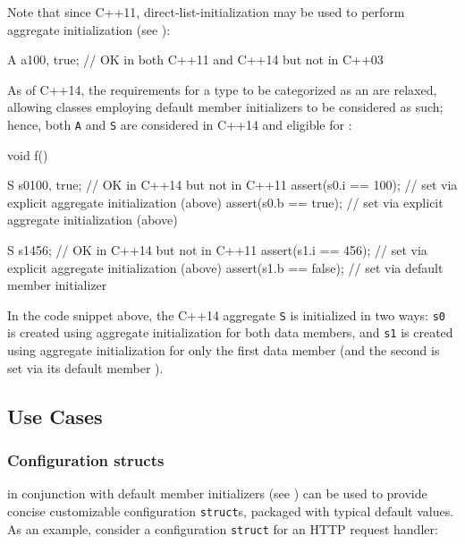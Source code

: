 \noindent Note that since C++11, direct-list-initialization may be used to perform aggregate initialization (see ):
\begin{emcppslisting}[language=C++]
A a{100, true};  // OK in both C++11 and C++14 but not in C++03
\end{emcppslisting}
As of C++14, the requirements for a type to be categorized as an
 are relaxed, allowing classes employing default
member initializers to be considered as such; hence, both \lstinline!A! and
\lstinline!S! are considered  in C++14 and eligible for
:

\begin{emcppslisting}[language=C++]
void f()
{
    S s0{100, true};        // OK in C++14 but not in C++11
    assert(s0.i == 100);    // set via explicit aggregate initialization (above)
    assert(s0.b == true);   // set via explicit aggregate initialization (above)

    S s1{456};              // OK in C++14 but not in C++11
    assert(s1.i == 456);    // set via explicit aggregate initialization (above)
    assert(s1.b == false);  // set via default member initializer
}
\end{emcppslisting}

\noindent In the code snippet above, the C++14 aggregate \lstinline!S! is initialized
in two ways: \lstinline!s0! is created using aggregate initialization for
both data members, and \lstinline!s1! is created using aggregate
initialization for only the first data member (and the second is set via its
default member ).

\subsection[Use Cases]{Use Cases}\label{use-cases}

\subsubsection[Configuration \lstinline!struct!s]{Configuration {\SubsubsecCode struct}s}\label{configuration-structs}

 in conjunction with default member initializers (see ) can be used to provide concise customizable
configuration \lstinline!struct!s, packaged with typical default values. As
an example, consider a configuration \lstinline!struct! for an HTTP request
handler:


